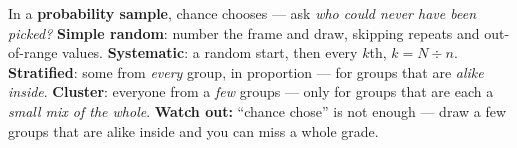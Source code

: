 \documentclass[12pt]{article}
\begin{document}
\vspace{0.14in}

\begin{remindbox}
\small
In a \textbf{probability sample}, chance chooses --- ask \emph{who could never have been
picked?} \textbf{Simple random}: number the frame and draw, skipping repeats and out-of-range
values. \textbf{Systematic}: a random start, then every $k$th, $k = N \div n$.
\textbf{Stratified}: some from \emph{every} group, in proportion --- for groups that are
\emph{alike inside}. \textbf{Cluster}: everyone from a \emph{few} groups --- only for groups
that are each a \emph{small mix of the whole}. \textbf{Watch out:} ``chance chose'' is not
enough --- draw a few groups that are alike inside and you can miss a whole grade.
\end{remindbox}
\end{document}
